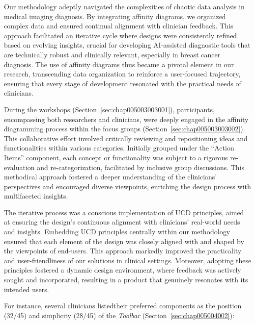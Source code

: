 \vspace{0.10mm}

\textcolor{revised}{Our methodology adeptly navigated the complexities of chaotic data analysis in medical imaging diagnosis.
By integrating affinity diagrams, we organized complex data and ensured continual alignment with clinician feedback.
This approach facilitated an iterative cycle where designs were consistently refined based on evolving insights, crucial for developing \ac{AI}-assisted diagnostic tools that are technically robust and clinically relevant, especially in breast cancer diagnosis.
The use of affinity diagrams thus became a pivotal element in our research, transcending data organization to reinforce a user-focused trajectory, ensuring that every stage of development resonated with the practical needs of clinicians.}

\textcolor{revised}{During the workshops (Section~\ref{sec:chap005003003001}), participants, encompassing both researchers and clinicians, were deeply engaged in the affinity diagramming process within the focus groups (Section~\ref{sec:chap005003003002}).
This collaborative effort involved critically reviewing and repositioning ideas and functionalities within various categories.
Initially grouped under the ``Action Items'' component, each concept or functionality was subject to a rigorous re-evaluation and re-categorization, facilitated by inclusive group discussions.
This methodical approach fostered a deeper understanding of the clinicians' perspectives and encouraged diverse viewpoints, enriching the design process with multifaceted insights.}

\textcolor{revised}{The iterative process was a conscious implementation of \ac{UCD} principles, aimed at ensuring the design's continuous alignment with clinicians' real-world needs and insights.
Embedding \ac{UCD} principles centrally within our methodology ensured that each element of the design was closely aligned with and shaped by the viewpoints of end-users.
This approach markedly improved the practicality and user-friendliness of our solutions in clinical settings.
Moreover, adopting these principles fostered a dynamic design environment, where feedback was actively sought and incorporated, resulting in a product that genuinely resonates with its intended users.}


\noindent
For instance, several clinicians listed\footnotemark[8] their preferred components as the position (32/45) and simplicity (28/45) of the {\it Toolbar} (Section~\ref{sec:chap005004002}):

